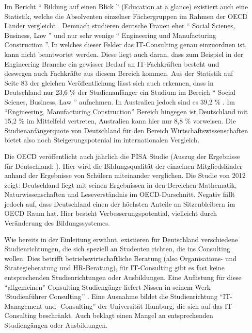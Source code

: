 Im Bericht `` Bildung auf einen Blick '' (Education at a glance) existiert auch eine Statistik, welche die Absolventen einzelner Fächergruppen im Rahmen der OECD Länder vergleicht \cite{oecd3}. Demnach studieren deutsche Frauen eher `` Social Scienes, Business, Law '' und nur sehr wenige `` Engineering und Manufacturing Construction ''. In welches dieser Felder das IT-Consulting genau einzuordnen ist, kann nicht beantwortet werden. Diese liegt auch daran, dass zum Beispiel in der Engineering Branche ein gewisser Bedarf an IT-Fachkräften besteht und deswegen auch Fachkräfte aus diesem Bereich kommen. Aus der Statistik auf Seite 83 der gleichen Veröffentlichung lässt sich auch erkennen, dass in Deutschland nur 23,6 \% der Studienanfänger ein Studium im Bereich `` Social Scienes, Business, Law '' aufnehmen. In Australien jedoch sind es 39,2 \% . Im ``Engineering, Manufacturing Construction'' Bereich hingegen ist Deutschland mit 15,2 \% im Mittelfeld vertreten, Australien kann hier nur  8,8 \% vorweisen. Die Studienanfängerquote von Deutschland für den Bereich Wirtschaftswissenschaften bietet also noch Steigerungspotenial  im internationalen Vergleich.

Die OECD veröffentlicht auch jährlich die PISA Studie (Auszug der Ergebnisse für Deutschland: \cite{pisa} ). Hier wird die Bildungsqualität der einzelnen Mitgliedsländer anhand der Ergebnisse von Schülern miteinander verglichen. Die Studie von 2012 zeigt: Deutschland liegt mit seinen Ergebnissen in den Bereichen Mathematik, Naturwissenschaften und Leseverständnis im OECD-Durschnitt. Negativ fällt jedoch auf, dass Deutschland einen der höchsten Anteile an Sitzenbleibern im OECD Raum hat. Hier besteht Verbesserungspotential, vielleicht durch Veränderung des Bildungssystemes.

Wie bereits in der Einleitung erwähnt, existieren für Deutschland verschiedene Studienrichtungen, die sich speziell an Studenten richten, die ins Consulting wollen. Dies betrifft betriebswirtschaftliche Beratung (also Organisations- und Strategieberatung und HR-Beratung), für IT-Consulting gibt es fast keine entsprechenden Studienrichtungen oder Ausbildungen.
Eine Auflistung für diese ``allgemeinen'' Consulting Studiengänge liefert Nissen in seinem Werk `Studienf{\"u}hrer Consulting'' \cite{NissenKlaukDeelmannMohe201209}. 
Eine Ausnahme bildet die Studienrichtung ``IT-Management und -Consulting'' der Universität Hamburg, die sich auf das IT-Consulting beschränkt. Auch \cite{IDSScheer} beklagt einen Mangel an entsprechenden Studiengängen oder Ausbildungen.


